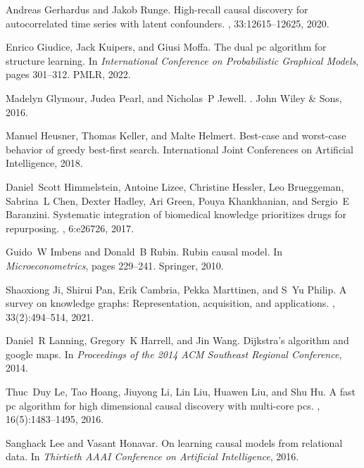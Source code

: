 \documentclass[11pt]{article}
\begin{document}
\begin{thebibliography}{10}
Andreas Gerhardus and Jakob Runge.
\newblock High-recall causal discovery for autocorrelated time series with
  latent confounders.
,
  33:12615--12625, 2020.

Enrico Giudice, Jack Kuipers, and Giusi Moffa.
\newblock The dual pc algorithm for structure learning.
\newblock In {\em International Conference on Probabilistic Graphical Models},
  pages 301--312. PMLR, 2022.

Madelyn Glymour, Judea Pearl, and Nicholas~P Jewell.
.
\newblock John Wiley \& Sons, 2016.

Manuel Heusner, Thomas Keller, and Malte Helmert.
\newblock Best-case and worst-case behavior of greedy best-first search.
\newblock International Joint Conferences on Artificial Intelligence, 2018.

Daniel~Scott Himmelstein, Antoine Lizee, Christine Hessler, Leo Brueggeman,
  Sabrina~L Chen, Dexter Hadley, Ari Green, Pouya Khankhanian, and Sergio~E
  Baranzini.
\newblock Systematic integration of biomedical knowledge prioritizes drugs for
  repurposing.
, 6:e26726, 2017.

Guido~W Imbens and Donald~B Rubin.
\newblock Rubin causal model.
\newblock In {\em Microeconometrics}, pages 229--241. Springer, 2010.

Shaoxiong Ji, Shirui Pan, Erik Cambria, Pekka Marttinen, and S~Yu Philip.
\newblock A survey on knowledge graphs: Representation, acquisition, and
  applications.
,
  33(2):494--514, 2021.

Daniel~R Lanning, Gregory~K Harrell, and Jin Wang.
\newblock Dijkstra's algorithm and google maps.
\newblock In {\em Proceedings of the 2014 ACM Southeast Regional Conference},
  2014.

Thuc~Duy Le, Tao Hoang, Jiuyong Li, Lin Liu, Huawen Liu, and Shu Hu.
\newblock A fast pc algorithm for high dimensional causal discovery with
  multi-core pcs.
, 16(5):1483--1495, 2016.

Sanghack Lee and Vasant Honavar.
\newblock On learning causal models from relational data.
\newblock In {\em Thirtieth AAAI Conference on Artificial Intelligence}, 2016.


\end{thebibliography}
\end{document}
